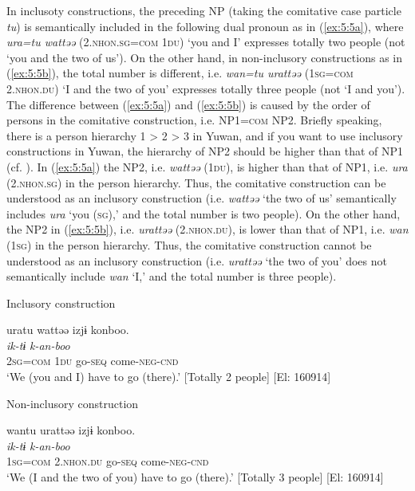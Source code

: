 In inclusoty constructions, the preceding NP (taking the comitative case particle \textit{tu}) is semantically included in the following dual pronoun as in (\ref{ex:5:5a}), where \textit{ura=tu wattəə} (2\textsc{.nhon.sg=com} 1\textsc{du}) ‘you and I’ expresses totally two people (not ‘you and the two of us’). On the other hand, in non-inclusory constructions as in (\ref{ex:5:5b}), the total number is different, i.e. \textit{wan=tu urattəə} (1\textsc{sg=com} 2\textsc{.nhon.du}) ‘I and the two of you’ expresses totally three people (not ‘I and you’). The difference between (\ref{ex:5:5a}) and (\ref{ex:5:5b}) is caused by the order of persons in the comitative construction, i.e. NP\textsc{1}=\textsc{com} NP\textsc{2}. Briefly speaking, there is a person hierarchy 1 > 2 > 3 in Yuwan, and if you want to use inclusory constructions in Yuwan, the hierarchy of NP\textsc{2} should be higher than that of NP\textsc{1} (cf. \citealt{Niinaga2020a}). In (\ref{ex:5:5a}) the NP\textsc{2}, i.e. \textit{wattəə} (\textsc{1du}), is higher than that of NP\textsc{1}, i.e. \textit{ura} (2\textsc{.nhon.sg}) in the person hierarchy. Thus, the comitative construction can be understood as an inclusory construction (i.e. \textit{wattəə} ‘the two of us’ semantically includes \textit{ura} ‘you (\textsc{sg}),’ and the total number is two people). On the other hand, the NP\textsc{2} in (\ref{ex:5:5b}), i.e. \textit{urattəə} (2\textsc{.nhon.du}), is lower than that of NP\textsc{1}, i.e. \textit{wan} (1\textsc{sg}) in the person hierarchy. Thus, the comitative construction cannot be understood as an inclusory construction (i.e. \textit{urattəə} ‘the two of you’ does not semantically include \textit{wan} ‘I,’ and the total number is three people).

\ea \label{ex:5:5}  \ea \label{ex:5:5a} Inclusory construction
 
\glll  uratu wattəə izjɨ konboo.\\
   \textit{ik-tɨ} \textit{k-an-boo}\\
2\textsc{sg=com}  1\textsc{du}  go-\textsc{seq} come-\textsc{neg-cnd}\\
\glt ‘We (you and I) have to go (there).’ [Totally 2 people] [El: 160914]

\ex \label{ex:5:5b} Non-inclusory construction

\glll  wantu urattəə izjɨ konboo.\\
    \textit{ik-tɨ} \textit{k-an-boo}\\
1\textsc{sg=com}  2\textsc{.nhon.du}  go-\textsc{seq} come-\textsc{neg-cnd}\\
\glt ‘We (I and the two of you) have to go (there).’ [Totally 3 people] [El: 160914]
\z
\z

